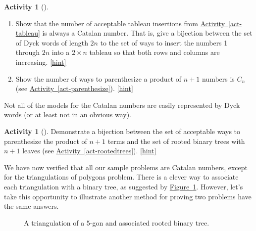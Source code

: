 \documentclass[10pt,]{book}
\theoremstyle{plain}
\theoremstyle{definition}
\theoremstyle{definition}
\theoremstyle{definition}
\newtheorem{activity}[project]{Activity}
\numberwithin{equation}{chapter}
\def\fivegon{%
    \coordinate (a) at (0,2.5);
    \coordinate (b) at (2,1.4);
    \coordinate (c) at (1,0);
    \coordinate (d) at (-.5,0);
    \coordinate (e) at (-2,1.5);
    \draw (a) -- (b) -- (c) -- (d) -- (e) -- (a);
  }
\newcommand{\vtx}[2]{node[fill,circle,inner sep=0pt, minimum size=4pt,label=#1:#2]{}}
\newcommand{\va}[1]{\vtx{above}{#1}}
\newcommand{\vr}[1]{\vtx{right}{#1}}
\newcommand{\vl}[1]{\vtx{left}{#1}}
\renewcommand{\v}{\vtx{above}{}}
\begin{document}
\begin{activity}[]\label{activity-172}
\leavevmode%
\begin{enumerate}[font=\bfseries,label=(\alph*),ref=\alph*]
\item\label{task-187} \hypertarget{p-1012}{}%
Show that the number of acceptable tableau insertions from \hyperref[act-tableau]{Activity~\ref{act-tableau}} is always a Catalan number.  That is, give a bijection between the set of Dyck words of length \(2n\) to the set of ways to insert the numbers 1 through \(2n\) into a \(2\times n\) tableau so that both rows and columns are increasing.%
\hfill{\tiny\hyperlink{a-179.a}{[hint]}\hypertarget{q-179.a}{}}\item\label{task-188} \hypertarget{p-1014}{}%
Show the number of ways to parenthesize a product of \(n+1\) numbers is \(C_n\) (see \hyperref[act-parenthesize]{Activity~\ref{act-parenthesize}}).%
\hfill{\tiny\hyperlink{a-179.b}{[hint]}\hypertarget{q-179.b}{}}\end{enumerate}
\end{activity}
\hypertarget{p-1016}{}%
Not all of the models for the Catalan numbers are easily represented by Dyck words (or at least not in an obvious way).%
\begin{activity}[]\label{activity-173}
\hypertarget{p-1017}{}%
Demonstrate a bijection between the set of acceptable ways to parenthesize the product of \(n+1\) terms and the set of rooted binary trees with \(n+1\) leaves (see \hyperref[act-rootedtrees]{Activity~\ref{act-rootedtrees}}).%
\hfill{\tiny\hyperlink{a-180}{[hint]}\hypertarget{q-180}{}}\end{activity}
\hypertarget{p-1019}{}%
We have now verified that all our sample problems are Catalan numbers, except for the triangulations of polygons problem.  There is a clever way to associate each triangulation with a binary tree, as suggested by \hyperref[fig-triangulationtree]{Figure~\ref{fig-triangulationtree}}.  However, let's take this opportunity to illustrate another method for proving two problems have the same answers.%
\begin{figure}
\centering
\begin{sidebyside}{2}{0.125}{0.125}{0.25}
\begin{sbspanel}{0.25}
\end{sbspanel}
\begin{sbspanel}{0.25}
\end{sbspanel}
\end{sidebyside}
\caption{A triangulation of a 5-gon and associated rooted binary tree.\label{fig-triangulationtree}}
\end{figure}
\end{document}
